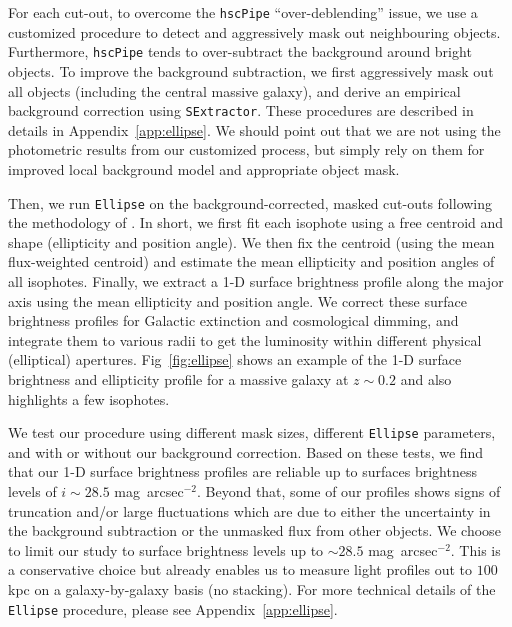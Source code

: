 \documentclass[a4paper,fleqn,usenatbib]{mnras}
\def\sb{mag~arcsec$^{-2}$}
\begin{document}
    For each cut-out, to overcome the \texttt{hscPipe} ``over-deblending'' issue, 
    we use a customized procedure to detect and aggressively mask out
    neighbouring objects. 
    Furthermore, \texttt{hscPipe} tends to over-subtract the background around 
    bright objects. 
    To improve the background subtraction, we first aggressively mask 
    out all objects (including the central massive galaxy), and derive an 
    empirical background correction using \texttt{SExtractor}.
    These procedures are described in details in Appendix~\ref{app:ellipse}. 
    We should point out that we are not using the photometric results from our 
    customized process, but simply rely on them for improved local background model
    and appropriate object mask.

    Then, we run \texttt{Ellipse} on the background-corrected, masked cut-outs 
    following the methodology of \citet{Li2012}. 
    In short, we first fit each isophote using a free centroid and shape 
    (ellipticity and position angle). 
    We then fix the centroid (using the mean flux-weighted centroid) and estimate
    the mean ellipticity and position angles of all isophotes. 
    Finally, we extract a 1-D surface brightness profile along the major axis using 
    the mean ellipticity and position angle. 
    We correct these surface brightness profiles for Galactic extinction and 
    cosmological dimming, and integrate them to various radii to get the luminosity 
    within different physical (elliptical) apertures. 
    Fig~\ref{fig:ellipse} shows an example of the 1-D surface brightness and 
    ellipticity profile for a massive galaxy at $z{\sim}0.2$ and also highlights 
    a few isophotes.    

    We test our procedure using different mask sizes, different \texttt{Ellipse} 
    parameters, and with or without our background correction. 
    Based on these tests, we find that our 1-D surface brightness profiles are reliable 
    up to surfaces brightness levels of $i{\sim}28.5$ \sb. 
    Beyond that, some of our profiles shows signs of truncation and/or large 
    fluctuations which are due to either the uncertainty in the background 
    subtraction or the unmasked flux from other objects.
    We choose to limit our study to surface brightness levels up to ${\sim} 28.5$ \sb. 
    This is a conservative choice but already enables us to measure light profiles 
    out to $100$ kpc on a galaxy-by-galaxy basis (no stacking). 
    For more technical details of the \texttt{Ellipse} procedure, please see 
    Appendix~\ref{app:ellipse}.
\end{document}
